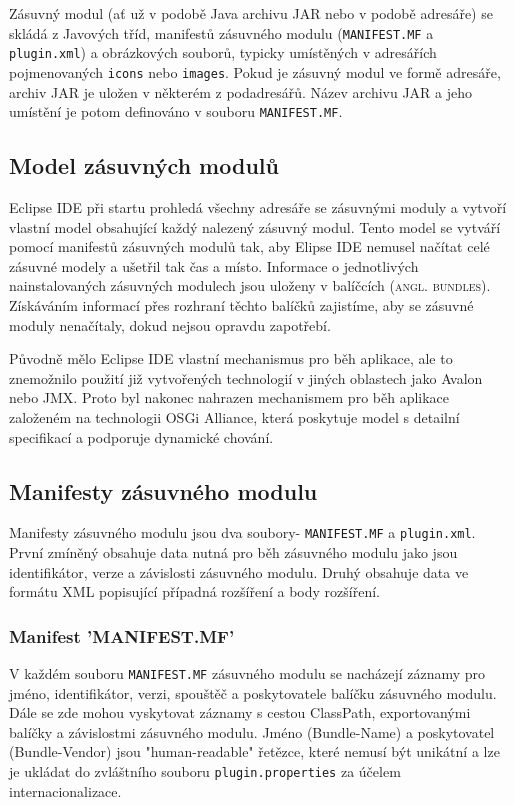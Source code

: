   Zásuvný modul (ať už v podobě Java archivu JAR nebo v podobě adresáře) se skládá z Javových tříd, manifestů zásuvného modulu (\texttt{MANIFEST.MF} a \texttt{plugin.xml}) a obrázkových souborů, typicky umístěných v adresářích pojmenovaných \texttt{icons} nebo \texttt{images}. Pokud je zásuvný modul ve formě adresáře, archiv JAR je uložen v některém z podadresářů. Název archivu JAR a jeho umístění je potom definováno v souboru \texttt{MANIFEST.MF}.

    \subsection{Model zásuvných modulů}
    Eclipse IDE při startu prohledá všechny adresáře se zásuvnými moduly a vytvoří vlastní model obsahující každý nalezený zásuvný modul. Tento model se vytváří pomocí manifestů zásuvných modulů tak, aby Elipse IDE nemusel načítat celé zásuvné modely a ušetřil tak čas a místo. Informace o jednotlivých nainstalovaných zásuvných modulech jsou uloženy v balíčcích (\textsc{angl. bundles}). Získáváním informací přes rozhraní těchto balíčků zajistíme, aby se zásuvné moduly nenačítaly, dokud nejsou opravdu zapotřebí.
    
    Původně mělo Eclipse IDE vlastní mechanismus pro běh aplikace, ale to znemožnilo použití již vytvořených technologií v jiných oblastech jako Avalon nebo JMX. Proto byl nakonec nahrazen mechanismem pro běh aplikace založeném na technologii OSGi Alliance, která poskytuje model s detailní specifikací a podporuje dynamické chování.\cite{Plugins}

    \subsection{Manifesty zásuvného modulu}
    Manifesty zásuvného modulu jsou dva soubory- \texttt{MANIFEST.MF} a \texttt{plugin.xml}. První zmíněný obsahuje data nutná pro běh zásuvného modulu jako jsou identifikátor, verze a závislosti zásuvného modulu. Druhý obsahuje data ve formátu XML popisující případná rozšíření a body rozšíření. 

      \subsubsection{Manifest 'MANIFEST.MF'}
      V každém souboru \texttt{MANIFEST.MF} zásuvného modulu se nacházejí záznamy pro jméno, identifikátor, verzi, spouštěč a poskytovatele balíčku zásuvného modulu. Dále se zde mohou vyskytovat záznamy s cestou ClassPath, exportovanými balíčky a závislostmi zásuvného modulu.
      Jméno (Bundle-Name) a poskytovatel (Bundle-Vendor) jsou "human-readable" řetězce, které nemusí být unikátní a lze je ukládat do zvláštního souboru \texttt{plugin.properties} za účelem internacionalizace.

